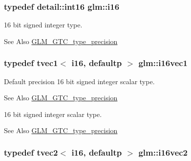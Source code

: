 \hypertarget{group__gtc__type__precision_ga35e5542ca05b29cc256fdafb8503d1fd}{
\subsubsection[{i16}]{\setlength{\rightskip}{0pt plus 5cm}typedef detail\-::int16 {\bf glm\-::i16}}}\label{group__gtc__type__precision_ga35e5542ca05b29cc256fdafb8503d1fd}
16 bit signed integer type. \begin{DoxySeeAlso}{See Also}
\hyperlink{group__gtc__type__precision}{G\-L\-M\-\_\-\-G\-T\-C\-\_\-type\-\_\-precision} 
\end{DoxySeeAlso}
\hypertarget{group__gtc__type__precision_gacec84a02174e44363dd105769fb22473}{
\subsubsection[{i16vec1}]{\setlength{\rightskip}{0pt plus 5cm}typedef tvec1$<$ i16, defaultp $>$ {\bf glm\-::i16vec1}}}\label{group__gtc__type__precision_gacec84a02174e44363dd105769fb22473}
Default precision 16 bit signed integer scalar type. \begin{DoxySeeAlso}{See Also}
\hyperlink{group__gtc__type__precision}{G\-L\-M\-\_\-\-G\-T\-C\-\_\-type\-\_\-precision}
\end{DoxySeeAlso}
16 bit signed integer scalar type. \begin{DoxySeeAlso}{See Also}
\hyperlink{group__gtc__type__precision}{G\-L\-M\-\_\-\-G\-T\-C\-\_\-type\-\_\-precision} 
\end{DoxySeeAlso}
\hypertarget{group__gtc__type__precision_ga37af364ff13fb791571dd324dfd3ca89}{
\subsubsection[{i16vec2}]{\setlength{\rightskip}{0pt plus 5cm}typedef tvec2$<$ i16, defaultp $>$ {\bf glm\-::i16vec2}}}\label{group__gtc__type__precision_ga37af364ff13fb791571dd324dfd3ca89}
